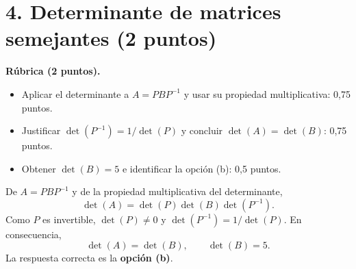 \documentclass[10pt,a4]{examenEPN0}
\begin{document}
\section*{4. Determinante de matrices semejantes (2 puntos)}
\noindent\textbf{Rúbrica (2 puntos).}
\begin{itemize}[itemsep=2pt]
    \item Aplicar el determinante a $A=PBP^{-1}$ y usar su propiedad
          multiplicativa: 0,75 puntos.
    \item Justificar $\det(P^{-1})=1/\det(P)$ y concluir
          $\det(A)=\det(B)$: 0,75 puntos.
    \item Obtener $\det(B)=5$ e identificar la opción (b): 0,5 puntos.
\end{itemize}

De $A=PBP^{-1}$ y de la propiedad multiplicativa del determinante,
\[
    \det(A)=\det(P)\det(B)\det(P^{-1}).
\]
Como $P$ es invertible, $\det(P)\ne0$ y
$\det(P^{-1})=1/\det(P)$. En consecuencia,
\[
    \det(A)=\det(B),\qquad \boxed{\det(B)=5.}
\]
La respuesta correcta es la \textbf{opción (b)}.
\end{document}
